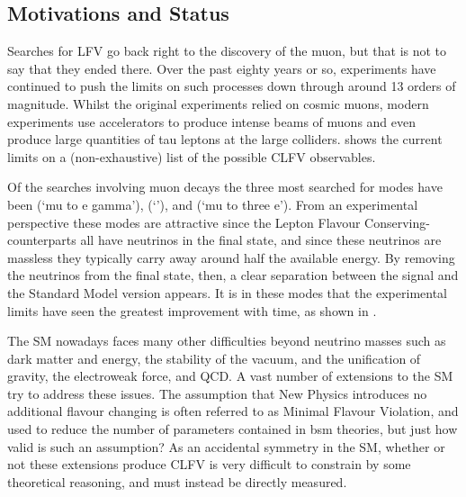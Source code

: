 \subsection{Motivations and Status}
Searches for \ac{LFV} go back right to the discovery of the muon, but that is not to say that they ended there.
Over the past eighty years or so, experiments have continued to push the limits on such processes down through around 13 orders of magnitude.
Whilst the original experiments relied on cosmic muons, modern experiments use accelerators to produce 
intense beams of muons and even produce large quantities of tau leptons at the large colliders.
 shows the current limits on a (non-exhaustive) list of the possible \ac{CLFV} observables.

Of the searches involving muon decays the three most searched for modes have been \mueg (`mu to e gamma'), \muec (`\mueconv'), and \muThreeE (`mu to three e').
From an experimental perspective these modes are attractive since the Lepton Flavour Conserving-counterparts all have neutrinos in the final state, and since these neutrinos are massless they typically carry away around half the available energy.
By removing the neutrinos from the final state, then, a clear separation between the signal and the Standard Model version appears.
It is in these modes that the experimental limits have seen the greatest improvement with time, as shown in .

The \ac{SM} nowadays faces many other difficulties beyond neutrino masses such as dark matter and energy, the stability of the vacuum, and the unification of gravity, the electroweak force, and \ac{QCD}.
A vast number of extensions to the \ac{SM} try to address these issues.
The assumption that New Physics introduces no additional flavour changing is often referred to as Minimal Flavour Violation, and used to reduce the number of parameters contained in \ac{bsm} theories, but just how valid is such an assumption?
As an accidental symmetry in the \ac{SM}, whether or not these extensions produce \ac{CLFV} is very difficult to constrain by some theoretical reasoning, and must instead be directly measured.

